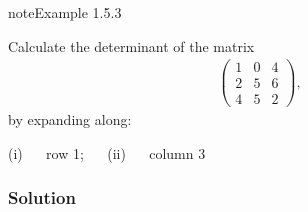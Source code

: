 \documentclass[letterpaper,10pt,english]{jupyterBook}
\begin{document}
\label{_pages/1.4_Determinants:nxn-determinant-example}
\begin{sphinxadmonition}{note}{Example 1.5.3}



\sphinxAtStartPar
Calculate the determinant of the matrix
\begin{equation*}
\begin{split} \begin{pmatrix} 1 & 0 & 4 \\ 2 & 5 & 6 \\ 4 & 5 & 2 \end{pmatrix}, \end{split}
\end{equation*}
\sphinxAtStartPar
by expanding along:

\sphinxAtStartPar
(i)   row 1;  
(ii)   column 3
\subsubsection*{Solution}


\end{sphinxadmonition}
\end{document}

